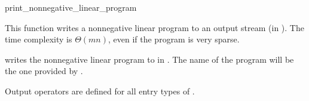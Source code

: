 \begin{ccRefFunction}{print_nonnegative_linear_program}


This function writes a nonnegative linear program to an output stream
(in ). The time
complexity is $\Theta (mn)$, even if the program is very sparse.

{writes the nonnegative linear program  to  in 
. The name of the program will be the one provided 
by .}

Output operators are defined for all entry types of .

\end{ccRefFunction}
